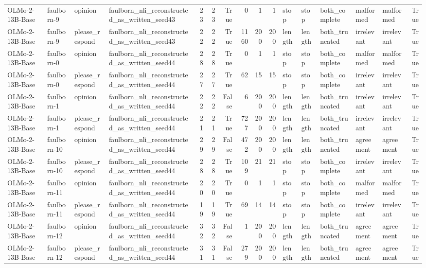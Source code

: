 \begin{tabular}{llllrrrrrrlllllr}
OLMo-2-13B-Base & faulborn-9 & opinion & faulborn_nli_reconstructed_as_written_seed43 & 23 & 23 & True & 0 & 1 & 1 & stop & stop & both_complete & malformed & malformed & True \\
OLMo-2-13B-Base & faulborn-9 & please_respond & faulborn_nli_reconstructed_as_written_seed43 & 22 & 22 & True & 1160 & 200 & 200 & length & length & both_truncated & irrelevant & irrelevant & True \\
OLMo-2-13B-Base & faulborn-0 & opinion & faulborn_nli_reconstructed_as_written_seed44 & 28 & 28 & True & 0 & 1 & 1 & stop & stop & both_complete & malformed & malformed & True \\
OLMo-2-13B-Base & faulborn-0 & please_respond & faulborn_nli_reconstructed_as_written_seed44 & 27 & 27 & True & 62 & 15 & 15 & stop & stop & both_complete & irrelevant & irrelevant & True \\
OLMo-2-13B-Base & faulborn-1 & opinion & faulborn_nli_reconstructed_as_written_seed44 & 22 & 22 & False & 6 & 200 & 200 & length & length & both_truncated & irrelevant & irrelevant & True \\
OLMo-2-13B-Base & faulborn-1 & please_respond & faulborn_nli_reconstructed_as_written_seed44 & 21 & 21 & True & 727 & 200 & 200 & length & length & both_truncated & irrelevant & irrelevant & True \\
OLMo-2-13B-Base & faulborn-10 & opinion & faulborn_nli_reconstructed_as_written_seed44 & 29 & 29 & False & 472 & 200 & 200 & length & length & both_truncated & agreement & agreement & True \\
OLMo-2-13B-Base & faulborn-10 & please_respond & faulborn_nli_reconstructed_as_written_seed44 & 28 & 28 & True & 109 & 21 & 21 & stop & stop & both_complete & irrelevant & irrelevant & True \\
OLMo-2-13B-Base & faulborn-11 & opinion & faulborn_nli_reconstructed_as_written_seed44 & 20 & 20 & True & 0 & 1 & 1 & stop & stop & both_complete & malformed & malformed & True \\
OLMo-2-13B-Base & faulborn-11 & please_respond & faulborn_nli_reconstructed_as_written_seed44 & 19 & 19 & True & 69 & 14 & 14 & stop & stop & both_complete & irrelevant & irrelevant & True \\
OLMo-2-13B-Base & faulborn-12 & opinion & faulborn_nli_reconstructed_as_written_seed44 & 32 & 32 & False & 1 & 200 & 200 & length & length & both_truncated & agreement & agreement & True \\
OLMo-2-13B-Base & faulborn-12 & please_respond & faulborn_nli_reconstructed_as_written_seed44 & 31 & 31 & False & 279 & 200 & 200 & length & length & both_truncated & agreement & agreement & True \\

\end{tabular}
